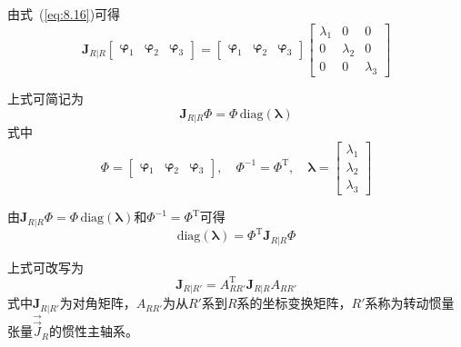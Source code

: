 由式~(\ref{eq:8.16})可得
\begin{equation}
\boldsymbol{J}_{R|R}
\begin{bmatrix}
\boldsymbol{\varphi}_1 & \boldsymbol{\varphi}_2 & \boldsymbol{\varphi}_3
\end{bmatrix}
=
\begin{bmatrix}
\boldsymbol{\varphi}_1 & \boldsymbol{\varphi}_2 & \boldsymbol{\varphi}_3
\end{bmatrix}
\begin{bmatrix}
\lambda_1 & 0      & 0      \\
0      & \lambda_2 & 0      \\
0      & 0      & \lambda_3
\end{bmatrix}
\label{eq:8.17}
\end{equation}

上式可简记为
\begin{equation}
\boldsymbol{J}_{R|R}\Phi = \Phi\,\mathrm{diag}(\boldsymbol{\lambda})
\end{equation}
式中
\begin{equation}
\Phi = \begin{bmatrix}
\boldsymbol{\varphi}_1 & \boldsymbol{\varphi}_2 & \boldsymbol{\varphi}_3
\end{bmatrix}, \quad
\Phi^{-1} = \Phi^{\mathrm{T}}, \quad
\boldsymbol{\lambda} = \begin{bmatrix}
\lambda_1 \\ \lambda_2 \\ \lambda_3
\end{bmatrix}
\end{equation}

由$\boldsymbol{J}_{R|R}\Phi = \Phi\,\mathrm{diag}(\boldsymbol{\lambda})$和$\Phi^{-1} = \Phi^{\mathrm{T}}$可得
\begin{equation}
\mathrm{diag}(\boldsymbol{\lambda}) = \Phi^{\mathrm{T}}\boldsymbol{J}_{R|R}\Phi
\label{eq:8.18}
\end{equation}

上式可改写为
\begin{equation}
\boldsymbol{J}_{R|R'} = A_{RR'}^{\mathrm{T}}\boldsymbol{J}_{R|R}A_{RR'}
\label{eq:8.19}
\end{equation}
式中$\boldsymbol{J}_{R|R'}$为对角矩阵，$A_{RR'}$为从$R'$系到$R$系的坐标变换矩阵，$R'$系称为转动惯量张量$\vec{\vec{J}}_R$的惯性主轴系。
